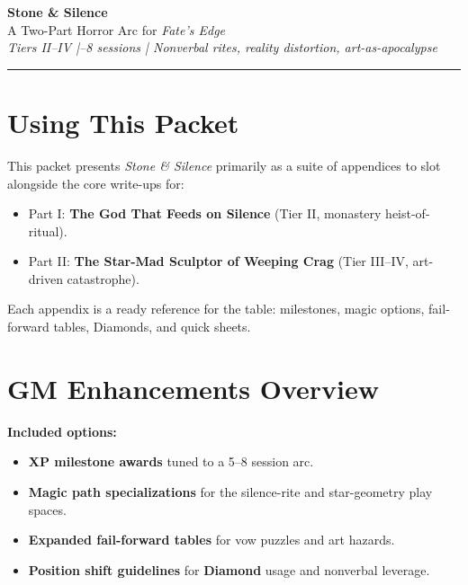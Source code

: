 \documentclass[11pt]{article}
\newcommand{\Term}[1]{\textbf{#1}}
\newcommand{\Diamond}{\Term{Diamond}}
\begin{document}


\begin{center}
{\LARGE \textbf{Stone \& Silence}}\\[4pt]
{\large A Two-Part Horror Arc for \emph{Fate's Edge}}\\[2pt]
\textit{Tiers II--IV \;|--8 sessions \;|\; Nonverbal rites, reality distortion, art-as-apocalypse}
\end{center}

\hrule
\vspace{0.5em}

\section*{Using This Packet}
This packet presents \emph{Stone \& Silence} primarily as a suite of appendices to slot alongside the core write-ups for:
\begin{itemize}
\item Part I: \textbf{The God That Feeds on Silence} (Tier II, monastery heist-of-ritual).
\item Part II: \textbf{The Star-Mad Sculptor of Weeping Crag} (Tier III--IV, art-driven catastrophe).
\end{itemize}
Each appendix is a ready reference for the table: milestones, magic options, fail-forward tables, Diamonds, and quick sheets.

\appendix


\section{GM Enhancements Overview}
\label{app:enhancements}
\textbf{Included options:}
\begin{itemize}
\item \textbf{XP milestone awards} tuned to a 5--8 session arc.
\item \textbf{Magic path specializations} for the silence-rite and star-geometry play spaces.
\item \textbf{Expanded fail-forward tables} for vow puzzles and art hazards.
\item \textbf{Position shift guidelines} for \Diamond{} usage and nonverbal leverage.
\end{itemize}
\end{document}

